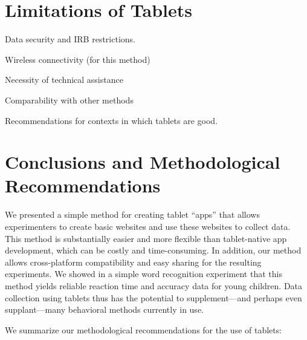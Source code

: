 \documentclass[man,noapacite]{apa2}
\begin{document}
\section{Limitations of Tablets}

Data security and IRB restrictions. 

Wireless connectivity (for this method)

Necessity of technical assistance

Comparability with other methods

Recommendations for contexts in which tablets are good. 



\section{Conclusions and Methodological Recommendations} 

We presented a simple method for creating tablet ``apps'' that allows experimenters to create basic websites and use these websites to collect data. This method is substantially easier and more flexible than tablet-native app development, which can be costly and time-consuming. In addition, our method allows cross-platform compatibility and easy sharing for the resulting experiments. We showed in a simple word recognition experiment that this method yields reliable reaction time and accuracy data for young children. Data collection using tablets thus has the potential to supplement---and perhaps even supplant---many behavioral methods currently in use. 

We summarize our methodological recommendations for the use of tablets:
\end{document}
